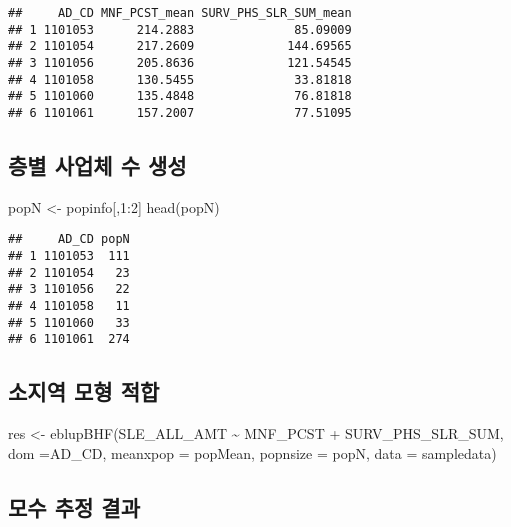 \documentclass[
]{book}
\newenvironment{Shaded}{\begin{snugshade}}{\end{snugshade}}
\newcommand{\AttributeTok}[1]{\textcolor[rgb]{0.77,0.63,0.00}{#1}}
\newcommand{\DecValTok}[1]{\textcolor[rgb]{0.00,0.00,0.81}{#1}}
\newcommand{\FunctionTok}[1]{\textcolor[rgb]{0.00,0.00,0.00}{#1}}
\newcommand{\NormalTok}[1]{#1}
\newcommand{\OtherTok}[1]{\textcolor[rgb]{0.56,0.35,0.01}{#1}}
\newcommand{\SpecialCharTok}[1]{\textcolor[rgb]{0.00,0.00,0.00}{#1}}
\begin{document}
\begin{verbatim}
##     AD_CD MNF_PCST_mean SURV_PHS_SLR_SUM_mean
## 1 1101053      214.2883              85.09009
## 2 1101054      217.2609             144.69565
## 3 1101056      205.8636             121.54545
## 4 1101058      130.5455              33.81818
## 5 1101060      135.4848              76.81818
## 6 1101061      157.2007              77.51095
\end{verbatim}

\hypertarget{uxce35uxbcc4-uxc0acuxc5c5uxccb4-uxc218-uxc0dduxc131}{%
\subsection{층별 사업체 수 생성}\label{uxce35uxbcc4-uxc0acuxc5c5uxccb4-uxc218-uxc0dduxc131}}

\begin{Shaded}
\begin{Highlighting}[]
\NormalTok{popN }\OtherTok{\textless{}{-}}\NormalTok{ popinfo[,}\DecValTok{1}\SpecialCharTok{:}\DecValTok{2}\NormalTok{]}
\FunctionTok{head}\NormalTok{(popN)}
\end{Highlighting}
\end{Shaded}

\begin{verbatim}
##     AD_CD popN
## 1 1101053  111
## 2 1101054   23
## 3 1101056   22
## 4 1101058   11
## 5 1101060   33
## 6 1101061  274
\end{verbatim}

\hypertarget{uxc18cuxc9c0uxc5ed-uxbaa8uxd615-uxc801uxd569}{%
\subsection{소지역 모형 적합}\label{uxc18cuxc9c0uxc5ed-uxbaa8uxd615-uxc801uxd569}}

\begin{Shaded}
\begin{Highlighting}[]
\NormalTok{res }\OtherTok{\textless{}{-}} \FunctionTok{eblupBHF}\NormalTok{(SLE\_ALL\_AMT }\SpecialCharTok{\textasciitilde{}}\NormalTok{ MNF\_PCST }\SpecialCharTok{+}\NormalTok{ SURV\_PHS\_SLR\_SUM, }\AttributeTok{dom =}\NormalTok{AD\_CD, }\AttributeTok{meanxpop =}\NormalTok{ popMean, }
                \AttributeTok{popnsize =}\NormalTok{ popN, }\AttributeTok{data =}\NormalTok{ sampledata)}
\end{Highlighting}
\end{Shaded}

\hypertarget{uxbaa8uxc218-uxcd94uxc815-uxacb0uxacfc}{%
\subsection{모수 추정 결과}\label{uxbaa8uxc218-uxcd94uxc815-uxacb0uxacfc}}
\end{document}
